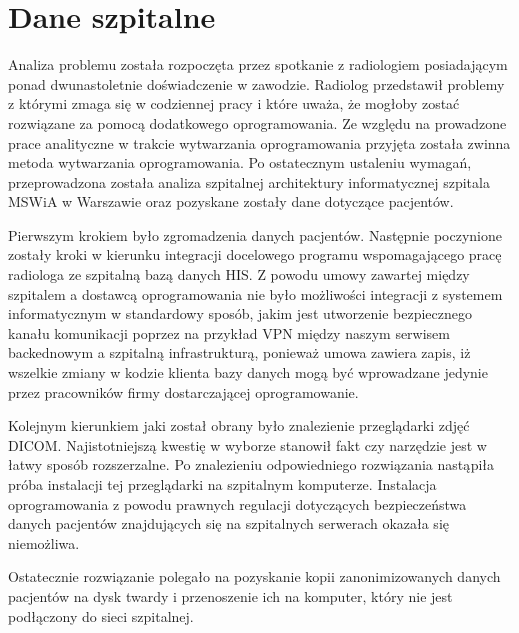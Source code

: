 \documentclass[a4paper,11pt,twoside]{report}
\theoremstyle{definition}
\begin{document}
\chapter{Dane szpitalne}
Analiza problemu została rozpoczęta przez spotkanie z radiologiem posiadającym ponad dwunastoletnie doświadczenie w zawodzie. Radiolog przedstawił problemy z którymi zmaga się w codziennej pracy i które uważa, że mogłoby zostać rozwiązane za pomocą dodatkowego oprogramowania. Ze względu na prowadzone prace analityczne w trakcie wytwarzania oprogramowania przyjęta została zwinna metoda wytwarzania oprogramowania. Po ostatecznym ustaleniu wymagań, przeprowadzona została analiza szpitalnej architektury informatycznej szpitala MSWiA w Warszawie oraz pozyskane zostały dane dotyczące pacjentów. 
\par
Pierwszym krokiem było zgromadzenia danych pacjentów. Następnie poczynione zostały kroki w kierunku integracji docelowego programu wspomagającego pracę radiologa ze szpitalną bazą danych HIS. Z powodu umowy zawartej między szpitalem a dostawcą oprogramowania nie było możliwości integracji z systemem informatycznym w standardowy sposób, jakim jest utworzenie bezpiecznego kanału komunikacji poprzez na przykład VPN między naszym serwisem backednowym a szpitalną infrastrukturą, ponieważ umowa zawiera zapis, iż wszelkie zmiany w kodzie klienta bazy danych mogą być wprowadzane jedynie przez pracowników firmy dostarczającej oprogramowanie.
\par
Kolejnym kierunkiem jaki został obrany było znalezienie przeglądarki zdjęć DICOM. Najistotniejszą kwestię w wyborze stanowił fakt czy narzędzie jest w łatwy sposób rozszerzalne. Po znalezieniu odpowiedniego rozwiązania nastąpiła próba instalacji tej przeglądarki na szpitalnym komputerze. Instalacja oprogramowania z powodu prawnych regulacji dotyczących bezpieczeństwa danych pacjentów znajdujących się na szpitalnych serwerach okazała się niemożliwa.
\par
Ostatecznie rozwiązanie polegało na pozyskanie kopii zanonimizowanych danych pacjentów na dysk twardy i przenoszenie ich na komputer, który nie jest podłączony do sieci szpitalnej. 
\end{document}
